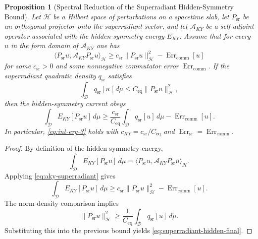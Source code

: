 \documentclass[12pt,a4paper]{article}
\newtheorem{proposition}[theorem]{Proposition}
\begin{document}
\begin{proposition}[Spectral Reduction of the Superradiant Hidden-Symmetry Bound]\label{prop:superradiant-spectral-reduction}
Let $\mathcal{H}$ be a Hilbert space of perturbations on a spacetime slab, let $P_{\mathrm{sr}}$ be an orthogonal projector onto the superradiant sector, and let $\mathcal{A}_{KY}$ be a self-adjoint operator associated with the hidden-symmetry energy $E_{KY}$. Assume that for every $u$ in the form domain of $\mathcal{A}_{KY}$ one has
\begin{equation}\label{eq:aky-superradiant}
\langle P_{\mathrm{sr}} u, \mathcal{A}_{KY} P_{\mathrm{sr}} u \rangle_{\mathcal{H}}
\ge c_{\mathrm{sr}} \|P_{\mathrm{sr}}u\|_{\mathcal{H}}^2 - \operatorname{Err}_{\mathrm{comm}}[u]
\end{equation}
for some $c_{\mathrm{sr}} > 0$ and some nonnegative commutator error $\operatorname{Err}_{\mathrm{comm}}$. If the superradiant quadratic density $q_{\mathrm{sr}}$ satisfies
\begin{equation}
\int_{\mathcal{D}} q_{\mathrm{sr}}[u] \, d\mu \le C_{\mathrm{eq}} \|P_{\mathrm{sr}}u\|_{\mathcal{H}}^2,
\end{equation}
then the hidden-symmetry current obeys
\begin{equation}\label{eq:superradiant-hidden-final}
\int_{\mathcal{D}} E_{KY}[P_{\mathrm{sr}}u] \, d\mu
\ge \frac{c_{\mathrm{sr}}}{C_{\mathrm{eq}}}\int_{\mathcal{D}} q_{\mathrm{sr}}[u] \, d\mu - \operatorname{Err}_{\mathrm{comm}}[u].
\end{equation}
In particular, \eqref{eq:int-erg-3} holds with $c_{KY} = c_{\mathrm{sr}}/C_{\mathrm{eq}}$ and $\operatorname{Err}_{\mathrm{sr}} = \operatorname{Err}_{\mathrm{comm}}$.
\end{proposition}

\begin{proof}
By definition of the hidden-symmetry energy,
\begin{equation}
\int_{\mathcal{D}} E_{KY}[P_{\mathrm{sr}}u] \, d\mu
= \langle P_{\mathrm{sr}} u, \mathcal{A}_{KY} P_{\mathrm{sr}} u \rangle_{\mathcal{H}}.
\end{equation}
Applying \eqref{eq:aky-superradiant} gives
\begin{equation}
\int_{\mathcal{D}} E_{KY}[P_{\mathrm{sr}}u] \, d\mu
\ge c_{\mathrm{sr}} \|P_{\mathrm{sr}}u\|_{\mathcal{H}}^2 - \operatorname{Err}_{\mathrm{comm}}[u].
\end{equation}
The norm-density comparison implies
\begin{equation}
\|P_{\mathrm{sr}}u\|_{\mathcal{H}}^2 \ge \frac{1}{C_{\mathrm{eq}}} \int_{\mathcal{D}} q_{\mathrm{sr}}[u] \, d\mu.
\end{equation}
Substituting this into the previous bound yields \eqref{eq:superradiant-hidden-final}.
\end{proof}
\end{document}
